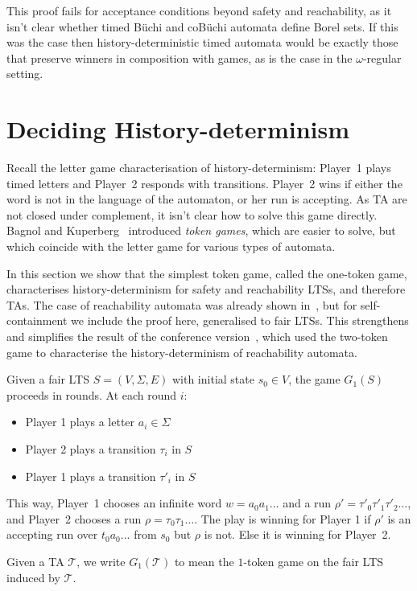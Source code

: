 \documentclass[10pt,a4paper]{amsart}
\theoremstyle{definition}
\numberwithin{equation}{section}
\newcommand{\T}{\mathcal{T}}
\newcommand{\lts}{S}
\begin{document}
This proof fails for acceptance conditions beyond safety and reachability, as it isn't clear whether timed B\"uchi and coB\"uchi automata define Borel sets. If this was the case then history-deterministic timed automata would be exactly those that preserve winners in composition with games, as is the case in the $\omega$-regular setting.
	
	\section{Deciding History-determinism}
	\label{sec_decision}
	\label{sec:decision}



Recall the letter game characterisation of history-determinism: Player~1 plays timed letters and Player~2 responds with transitions.  Player~2 wins if either the word is not in the language of the automaton, or her run is accepting.
As TA are not closed under complement, it isn't clear how to solve this game directly. Bagnol and Kuperberg~\cite{BK18} introduced  \textit{token games}, which are easier to solve, but which coincide with the letter game for various types of automata\cite{BK18,BKLS20,BL22}.

In this section we show that the simplest token game, called the one-token game, characterises history-determinism for safety and reachability LTSs, and therefore TAs. The case of reachability automata was already shown in~\cite{BL22}, but for self-containment we include the proof here, generalised to fair LTSs. This strengthens and simplifies the result of the conference version~\cite{HLT2022}, which used the two-token game to characterise the history-determinism of reachability automata.


\begin{definition}
Given a fair LTS 
$\lts=(V,\Sigma,E)$ with initial state $s_0\in V$, the game $G_1(\lts)$ proceeds in rounds. At each round $i$:
\begin{itemize}
\item Player 1 plays a letter $a_i\in\Sigma$
\item Player 2 plays a transition $\tau_i$ in $\lts$
\item Player 1 plays a transition $\tau'_{i}$ in $\lts$
\end{itemize}
This way, Player~1 chooses an infinite word 
$w=a_0a_1\ldots$ and a run $\rho'=\tau'_{0}\tau'_{1}\tau'_{2}\dots$,
and Player~2 chooses a run $\rho=\tau_0\tau_1\dots$.
The play is winning for Player 1 if $\rho'$ is an accepting run over $t_0a_0...$ from $s_0$ but $\rho$ is not. Else it is winning for Player~2.

Given a TA $\T$, we write $G_1(\T)$ to mean the $1$-token game on the fair LTS induced by $\T$.
\end{definition}
\end{document}
